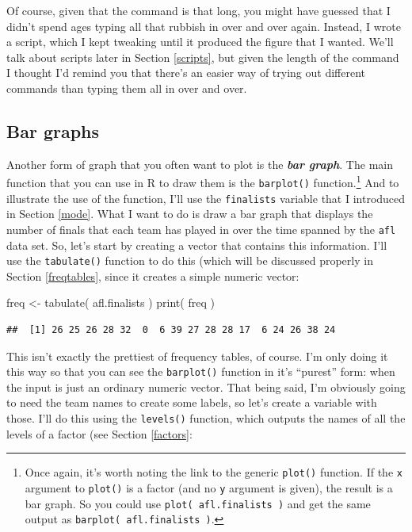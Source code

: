 \documentclass[
]{book}
\newenvironment{Shaded}{\begin{snugshade}}{\end{snugshade}}
\newcommand{\FunctionTok}[1]{\textcolor[rgb]{0.00,0.00,0.00}{#1}}
\newcommand{\NormalTok}[1]{#1}
\newcommand{\OtherTok}[1]{\textcolor[rgb]{0.56,0.35,0.01}{#1}}
\begin{document}
Of course, given that the command is that long, you might have guessed that I didn't spend ages typing all that rubbish in over and over again. Instead, I wrote a script, which I kept tweaking until it produced the figure that I wanted. We'll talk about scripts later in Section \ref{scripts}, but given the length of the command I thought I'd remind you that there's an easier way of trying out different commands than typing them all in over and over.

\hypertarget{bargraph}{%
\subsection{Bar graphs}\label{bargraph}}

Another form of graph that you often want to plot is the \textbf{\emph{bar graph}}. The main function that you can use in R to draw them is the \texttt{barplot()} function.\footnote{Once again, it's worth noting the link to the generic \texttt{plot()} function. If the \texttt{x} argument to \texttt{plot()} is a factor (and no \texttt{y} argument is given), the result is a bar graph. So you could use \texttt{plot(\ afl.finalists\ )} and get the same output as \texttt{barplot(\ afl.finalists\ )}.} And to illustrate the use of the function, I'll use the \texttt{finalists} variable that I introduced in Section \ref{mode}. What I want to do is draw a bar graph that displays the number of finals that each team has played in over the time spanned by the \texttt{afl} data set. So, let's start by creating a vector that contains this information. I'll use the \texttt{tabulate()} function to do this (which will be discussed properly in Section \ref{freqtables}, since it creates a simple numeric vector:

\begin{Shaded}
\begin{Highlighting}[]
\NormalTok{freq }\OtherTok{\textless{}{-}} \FunctionTok{tabulate}\NormalTok{( afl.finalists )}
\FunctionTok{print}\NormalTok{( freq )}
\end{Highlighting}
\end{Shaded}

\begin{verbatim}
##  [1] 26 25 26 28 32  0  6 39 27 28 28 17  6 24 26 38 24
\end{verbatim}

This isn't exactly the prettiest of frequency tables, of course. I'm only doing it this way so that you can see the \texttt{barplot()} function in it's ``purest'' form: when the input is just an ordinary numeric vector. That being said, I'm obviously going to need the team names to create some labels, so let's create a variable with those. I'll do this using the \texttt{levels()} function, which outputs the names of all the levels of a factor (see Section \ref{factors}:
\end{document}
